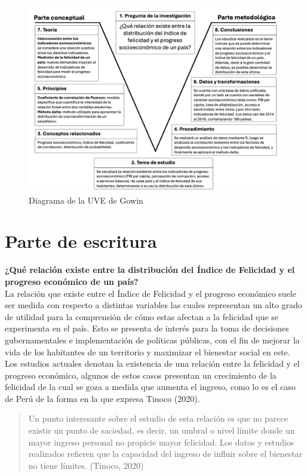 \begin{figure}[H]
        \centering
        \caption{Diagrama de la UVE de Gowin}
        \label{fig1Hora}
        \includegraphics[width = 17cm]{figures/diagrama_uve2.png}
    \end{figure}

\newpage

\section{Parte de escritura}
\textbf{¿Qué relación existe entre la distribución del Índice de Felicidad y el progreso económico de un país?} \\

La relación que existe entre el Índice de Felicidad y el progreso económico suele ser medida con respecto a distintas variables las cuales representan un alto grado de utilidad para la comprensión de cómo estas afectan a la felicidad que se experimenta en el país. Esto se presenta de interés para la toma de decisiones gubernamentales e implementación de políticas públicas, con el fin de mejorar la vida de los habitantes de un territorio y maximizar el bienestar social en este.\\
    
Los estudios actuales denotan la existencia de una relación entre la felicidad y el progreso económico, algunos de estos casos presentan un crecimiento de la felicidad de la cual se goza a medida que aumenta el ingreso, como lo es el caso de Perú de la forma en la que expresa Tinoco (2020). 
\begin{quote}
    Un punto interesante sobre el estudio de esta relación es que no parece existir un punto de saciedad, es decir, un umbral o nivel límite donde un mayor ingreso personal no propicie mayor felicidad. Los datos y estudios realizados refieren que la capacidad del ingreso de influir sobre el bienestar no tiene límites.
    \flushright (Tinoco, 2020) 
\end{quote}


